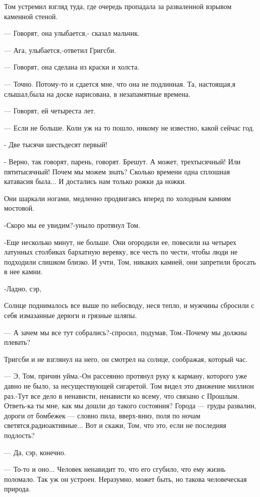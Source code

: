Том устремил взгляд туда, где очередь пропадала за разваленной взрывом каменной
стеной.

— Говорят, она улыбается,- сказал мальчик.

— Ага, улыбается,-ответил Григсби.

— Говорят, она сделана из краски и холста.

— Точно. Потому-то и сдается мне, что она не подлинная. Та, настоящая,я
слышал,была на доске нарисована, в незапамятные времена.

— Говорят, ей четыреста лет.

— Если не больше. Коли уж на то пошло, никому не известно, какой сейчас год.

- Две тысячи шестьдесят первый!

- Верно, так говорят, парень, говорят. Брешут. А может, трехтысячный! Или
пятитысячный! Почем мы можем знать? Сколько времени одна сплошная катавасия
была... И достались нам только рожки да ножки.

Они шаркали ногами, медленно продвигаясь вперед по холодным камням мостовой.

-Скоро мы ее увидим?-уныло протянул Том.

-Еще несколько минут, не больше. Они огородили ее, повесили на четырех латунных
столбиках бархатную веревку, все честь по чести, чтобы люди не подходили
слишком близко. И учти, Том, никаких камней, они запретили бросать в нее камни.

-Ладно, сэр,

Солнце поднималось все выше по небосводу, неся тепло, и мужчины сбросили с себя
измазанные дерюги и грязные шляпы.

— А зачем мы все тут собрались?-спросил, подумав, Том.-Почему мы должны
плевать?

Тригсби и не взглянул на него, он смотрел на солнце, соображая, который час.

— Э, Том, причин уйма.-Он рассеянно протянул руку к карману, которого уже давно
не было, за несуществующей сигаретой. Том видел это движение миллион раз.-Тут
все дело в ненависти, ненависти ко всему, что связано с Прошлым. Ответь-ка ты
мне, как мы дошли до такого состояния? Города — груды развалин, дороги от
бомбежек — словно пила, вверх-вниз, поля по ночам светятся,радиоактивные... Вот и
скажи, Том, что это, если не последняя подлость?

— Да, сэр, конечно.

— То-то и оно... Человек ненавидит то, что его сгубило, что ему жизнь поломало.
Так уж он устроен. Неразумно, может быть, но такова человеческая природа.

